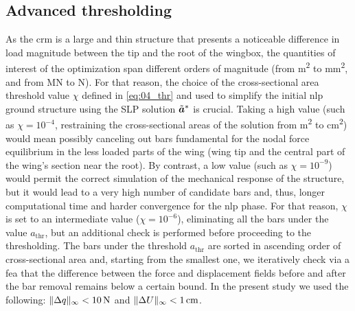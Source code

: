 \subsection{Advanced thresholding}
As the \gls{crm} is a large and thin structure that presents a noticeable difference in load magnitude between the tip and the root of the wingbox, the quantities of interest of the optimization span different orders of magnitude (from \unit{m^2} to \unit{mm^2}, and from \unit{MN} to \unit{N}). For that reason, the choice of the cross-sectional area threshold value $\chi$ defined in \eqref{eq:04_thr} and used to simplify the initial \gls{nlp} ground structure using the SLP solution $\tilde{\bm{a}}^*$ is crucial. Taking a high value (such as $\chi = 10^{-4}$, restraining the cross-sectional areas of the solution from \unit{m^2} to \unit{cm^2}) would mean possibly canceling out bars fundamental for the nodal force equilibrium in the less loaded parts of the wing (wing tip and the central part of the wing's section near the root). By contrast, a low value (such as $\chi=10^{-9}$) would permit the correct simulation of the mechanical response of the structure, but it would lead to a very high number of candidate bars and, thus, longer computational time and harder convergence for the \gls{nlp} phase. For that reason, $\chi$ is set to an intermediate value ($\chi=10^{-6}$), eliminating all the bars under the value $a_{\text{thr}}$, but an additional check is performed before proceeding to the thresholding. The bars under the threshold $a_{\text{thr}}$ are sorted in ascending order of cross-sectional area and, starting from the smallest one, we iteratively check via a \gls{fea} that the difference between the force and displacement fields before and after the bar removal remains below a certain bound. In the present study we used the following: $\lVert\Delta q\rVert_{\infty}<\qty{10}{N}$ and $\lVert\Delta U\rVert_{\infty}<\qty{1}{cm}$.
